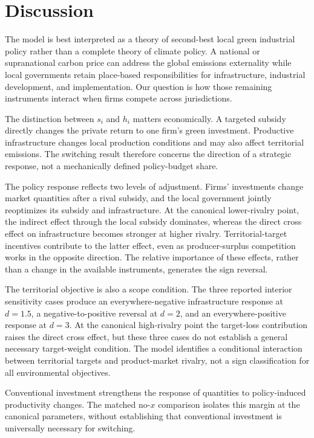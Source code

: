 \section{Discussion}
\label{sec:discussion}

The model is best interpreted as a theory of second-best local green industrial policy rather than a complete theory of climate policy. A national or supranational carbon price can address the global emissions externality while local governments retain place-based responsibilities for infrastructure, industrial development, and implementation. Our question is how those remaining instruments interact when firms compete across jurisdictions.

The distinction between $s_i$ and $h_i$ matters economically. A targeted subsidy directly changes the private return to one firm's green investment. Productive infrastructure changes local production conditions and may also affect territorial emissions. The switching result therefore concerns the direction of a strategic response, not a mechanically defined policy-budget share.

The policy response reflects two levels of adjustment. Firms' investments change market quantities after a rival subsidy, and the local government jointly reoptimizes its subsidy and infrastructure. At the canonical lower-rivalry point, the indirect effect through the local subsidy dominates, whereas the direct cross effect on infrastructure becomes stronger at higher rivalry. Territorial-target incentives contribute to the latter effect, even as producer-surplus competition works in the opposite direction. The relative importance of these effects, rather than a change in the available instruments, generates the sign reversal.

The territorial objective is also a scope condition. The three reported interior sensitivity cases produce an everywhere-negative infrastructure response at $d=1.5$, a negative-to-positive reversal at $d=2$, and an everywhere-positive response at $d=3$. At the canonical high-rivalry point the target-loss contribution raises the direct cross effect, but these three cases do not establish a general necessary target-weight condition. The model identifies a conditional interaction between territorial targets and product-market rivalry, not a sign classification for all environmental objectives.

Conventional investment strengthens the response of quantities to policy-induced productivity changes. The matched no-$x$ comparison isolates this margin at the canonical parameters, without establishing that conventional investment is universally necessary for switching.

